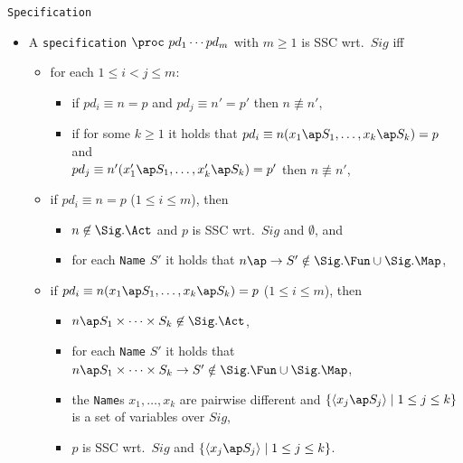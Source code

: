 \documentclass[twoside,fleqn,a4paper,dvips]{article}
\begin{document}
\begin{Dn-arg}{{\tt Specification}}
\begin{itemize}
\begin{itemize}
for each $1\leq i\leq m$, $k\geq 1$ and {\tt Name}s $S_1,\ldots,S_k$ it
holds
that if $n_{i2}\ap S_1\times\cdots\times S_k\in \Sig.\Act$ then
$n_{i1}\ap S_1\times\cdots\times
S_k\in \Sig.\Act$ and $n_{i3}\ap S_1\times\cdots\times S_k\in \Sig.\Act$,
\item
for each $1\leq i\leq m$ it holds
that if $n_{i1}\in \Sig.\Act$ then
$n_{i2}\in \Sig.\Act$ and $n_{i3}\in \Sig.\Act$,
\item
for each $1\leq i\leq m$ it holds
that if $n_{i2}\in \Sig.\Act$ then
$n_{i1}\in \Sig.\Act$ and $n_{i3}\in \Sig.\Act$.
\end{itemize}
\item
A {\tt specification} 
$\proc~pd_1\cdots pd_m$
with $m\geq 1$ is SSC wrt.\ $Sig$ iff
\begin{itemize}
\item
for each $1\leq i<j\leq m$:
\begin{itemize}
\item
if $pd_i\equiv n=p$ and $pd_j\equiv n'=p'$ then $n\not\equiv
n'$,
\item
if for some $k\geq1$ it holds that $pd_i\equiv
n(x_1\ap S_1,\ldots,x_k\ap S_k)=p$
and\\ $pd_j\equiv n'(x_1'\ap S_1,\ldots,x_k'\ap S_k)=p'$ then $n\not\equiv
n'$,
\end{itemize}
\item
if $pd_i\equiv n=p$ ($1\leq i\leq m$), then 
\begin{itemize}
\item
$n\not\in
\Sig.\Act$ and $p$ is SSC wrt.\ $Sig$ and $\emptyset$, and
\item
for each {\tt Name} $S'$ it holds that $n\ap \rightarrow S'\notin
\Sig.\Fun\cup\Sig.\Map$,
\end{itemize}
\item
if $pd_i\equiv n(x_{1}\ap S_{1},\ldots,x_{k}\ap S_{k})=p$
($1\leq i\leq m$), then
\begin{itemize}
\item $n\ap S_{1}\times\cdots\times S_{k}\not\in \Sig.\Act$,
\item
for each {\tt Name} $S'$ it holds that $n\ap S_{1}\times\cdots\times
S_{k}\rightarrow S'\notin \Sig.\Fun\cup\Sig.\Map$,
\item the {\tt Name}s $x_{1},\ldots,x_{k}$ are pairwise different
and $\{\langle x_{j}\ap S_{j}\rangle\mid 1\leq j\leq k\}$ is a set
of variables over $Sig$,
\item $p$ is SSC wrt.\ $Sig$ and $\{\langle
x_{j}\ap S_{j}\rangle\mid 1\leq j\leq k\}$.
\end{itemize}

\end{itemize}
\end{itemize}
\end{Dn-arg}
\end{document}
